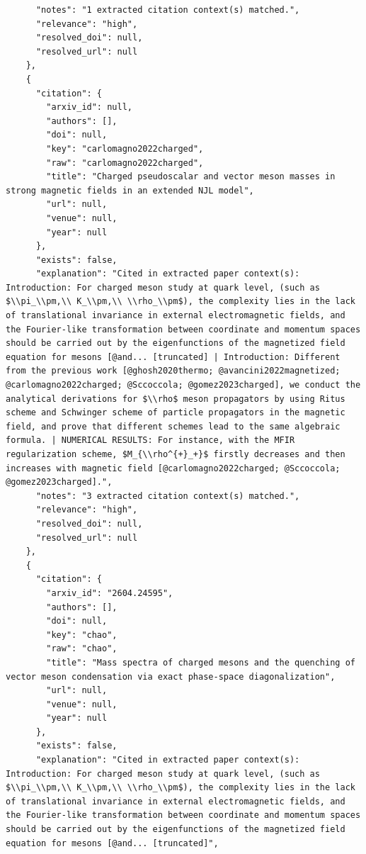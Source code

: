 \documentclass[11pt]{article}
\begin{document}
\begin{verbatim}
      "notes": "1 extracted citation context(s) matched.",
      "relevance": "high",
      "resolved_doi": null,
      "resolved_url": null
    },
    {
      "citation": {
        "arxiv_id": null,
        "authors": [],
        "doi": null,
        "key": "carlomagno2022charged",
        "raw": "carlomagno2022charged",
        "title": "Charged pseudoscalar and vector meson masses in strong magnetic fields in an extended NJL model",
        "url": null,
        "venue": null,
        "year": null
      },
      "exists": false,
      "explanation": "Cited in extracted paper context(s): Introduction: For charged meson study at quark level, (such as $\\pi_\\pm,\\ K_\\pm,\\ \\rho_\\pm$), the complexity lies in the lack of translational invariance in external electromagnetic fields, and the Fourier-like transformation between coordinate and momentum spaces should be carried out by the eigenfunctions of the magnetized field equation for mesons [@and... [truncated] | Introduction: Different from the previous work [@ghosh2020thermo; @avancini2022magnetized; @carlomagno2022charged; @Sccoccola; @gomez2023charged], we conduct the analytical derivations for $\\rho$ meson propagators by using Ritus scheme and Schwinger scheme of particle propagators in the magnetic field, and prove that different schemes lead to the same algebraic formula. | NUMERICAL RESULTS: For instance, with the MFIR regularization scheme, $M_{\\rho^{+}_+}$ firstly decreases and then increases with magnetic field [@carlomagno2022charged; @Sccoccola; @gomez2023charged].",
      "notes": "3 extracted citation context(s) matched.",
      "relevance": "high",
      "resolved_doi": null,
      "resolved_url": null
    },
    {
      "citation": {
        "arxiv_id": "2604.24595",
        "authors": [],
        "doi": null,
        "key": "chao",
        "raw": "chao",
        "title": "Mass spectra of charged mesons and the quenching of vector meson condensation via exact phase-space diagonalization",
        "url": null,
        "venue": null,
        "year": null
      },
      "exists": false,
      "explanation": "Cited in extracted paper context(s): Introduction: For charged meson study at quark level, (such as $\\pi_\\pm,\\ K_\\pm,\\ \\rho_\\pm$), the complexity lies in the lack of translational invariance in external electromagnetic fields, and the Fourier-like transformation between coordinate and momentum spaces should be carried out by the eigenfunctions of the magnetized field equation for mesons [@and... [truncated]",

\end{verbatim}
\end{document}
